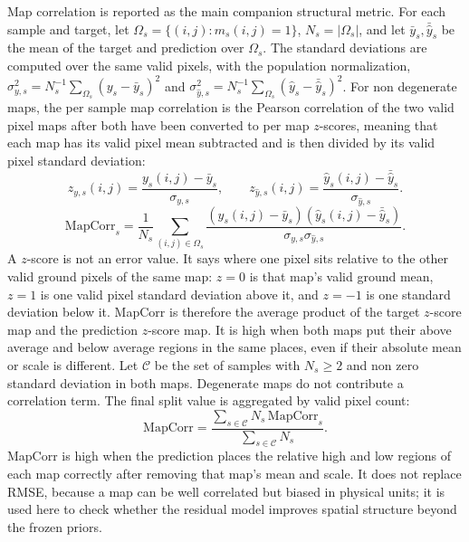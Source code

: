 Map correlation is reported as the main companion structural metric. For each
sample and target, let \(\Omega_s=\{(i,j):m_s(i,j)=1\}\),
\(N_s=|\Omega_s|\), and let
\(\bar y_s,\bar{\hat{y}}_s\) be the mean of the target and prediction over
\(\Omega_s\). The standard deviations are computed over the same valid pixels,
with the population normalization,
\(\sigma_{y,s}^2=N_s^{-1}\sum_{\Omega_s}(y_s-\bar y_s)^2\) and
\(\sigma_{\hat{y},s}^2=N_s^{-1}\sum_{\Omega_s}(\hat y_s-\bar{\hat{y}}_s)^2\).
For non degenerate maps, the per sample map correlation is the Pearson
correlation of the two valid pixel maps after both have been converted to per map
\(z\)-scores, meaning that each map has its valid pixel mean subtracted and is
then divided by its valid pixel standard deviation:
\begin{equation}
  z_{y,s}(i,j) = \frac{y_s(i,j)-\bar y_s}{\sigma_{y,s}},
  \qquad
  z_{\hat{y},s}(i,j) =
  \frac{\hat y_s(i,j)-\bar{\hat{y}}_s}{\sigma_{\hat{y},s}}.
  \label{eq:mapcorr_zscores}
\end{equation}
\begin{equation}
  \mathrm{MapCorr}_s
  =
  \frac{1}{N_s}
  \sum_{(i,j)\in\Omega_s}
  \frac{\left(y_s(i,j)-\bar y_s\right)
        \left(\hat y_s(i,j)-\bar{\hat{y}}_s\right)}
       {\sigma_{y,s}\sigma_{\hat{y},s}} .
  \label{eq:mapcorr}
\end{equation}
A \(z\)-score is not an error value. It says where one pixel sits relative to
the other valid ground pixels of the same map: \(z=0\) is that map's valid
ground mean, \(z=1\) is one valid pixel standard deviation above it, and
\(z=-1\) is one standard deviation below it. MapCorr is therefore the average
product of the target \(z\)-score map and the prediction \(z\)-score map. It is
high when both maps put their above average and below average regions in the
same places, even if their absolute mean or scale is different.
Let \(\mathcal{C}\) be the set of samples with \(N_s\ge 2\) and non zero
standard deviation in both maps. Degenerate maps do not contribute a
correlation term. The final split value is aggregated by valid pixel count:
\begin{equation}
  \mathrm{MapCorr}
  =
  \frac{\sum_{s\in\mathcal{C}} N_s\,\mathrm{MapCorr}_s}
       {\sum_{s\in\mathcal{C}} N_s}.
  \label{eq:mapcorr_aggregate}
\end{equation}
MapCorr is high when the prediction places the relative high and low regions of
each map correctly after removing that map's mean and scale. It does not replace
RMSE, because a map can be well correlated but biased in physical units; it is
used here to check whether the residual model improves spatial structure beyond
the frozen priors.
